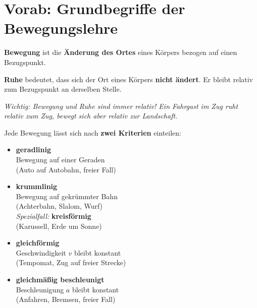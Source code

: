 \documentclass[11pt,a4paper]{article}
\begin{document}
\section*{Vorab: Grundbegriffe der Bewegungslehre}

\begin{merksatz}
\textbf{Bewegung} ist die \textbf{Änderung des Ortes} eines Körpers bezogen auf einen Bezugspunkt.

\textbf{Ruhe} bedeutet, dass sich der Ort eines Körpers \textbf{nicht ändert}. Er bleibt relativ zum Bezugspunkt an derselben Stelle.

\textit{Wichtig: Bewegung und Ruhe sind immer relativ! Ein Fahrgast im Zug ruht relativ zum Zug, bewegt sich aber relativ zur Landschaft.}
\end{merksatz}

\vspace{0.5cm}
Jede Bewegung lässt sich nach \textbf{zwei Kriterien} einteilen:

\vspace{0.5cm}

\begin{minipage}[t]{0.48\textwidth}
\begin{tcolorbox}[colback=physikblue!10, colframe=physikblue, title=\textbf{1. Bahnform}]
\begin{itemize}[leftmargin=0.5cm]
\item \textbf{geradlinig}\\
{\small Bewegung auf einer Geraden}\\
{\small (Auto auf Autobahn, freier Fall)}
\item \textbf{krummlinig}\\
{\small Bewegung auf gekrümmter Bahn}\\
{\small (Achterbahn, Slalom, Wurf)}\\[0.3em]
\textit{Spezialfall:} \textbf{kreisförmig}\\
{\small (Karussell, Erde um Sonne)}
\end{itemize}
\end{tcolorbox}
\end{minipage}
\hfill
\begin{minipage}[t]{0.48\textwidth}
\begin{tcolorbox}[colback=merkegreen!10, colframe=merkegreen, title=\textbf{2. Bewegungsart}]
\begin{itemize}[leftmargin=0.5cm]
\item \textbf{gleichförmig}\\
{\small Geschwindigkeit $v$ bleibt konstant}\\
{\small (Tempomat, Zug auf freier Strecke)}
\item \textbf{gleichmäßig beschleunigt}\\
{\small Beschleunigung $a$ bleibt konstant}\\
{\small (Anfahren, Bremsen, freier Fall)}
\end{itemize}
\end{tcolorbox}
\end{minipage}
\end{document}
